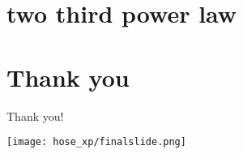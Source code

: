 \documentclass{beamer}
\begin{document}
\begin{frame}{}
  \titlepage
\end{frame}




\section{two third power law}
\setcounter{subsection}{4}


\section{Thank you}

\begin{frame}{Thank you!}
\begin{center}
\begin{LARGE}
 \texttt{[image: hose\_xp/finalslide.png]}
\end{LARGE}
\end{center}
\end{frame}
\end{document}
